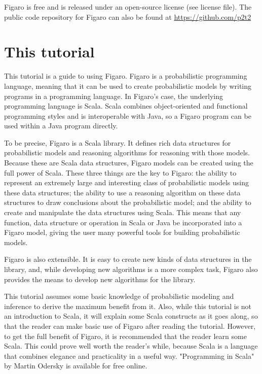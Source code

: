 Figaro is free and is released under an open-source license (see license file). The public code
repository for Figaro can also be found at \url{https://github.com/p2t2}



\section{This tutorial}

This tutorial is a guide to using Figaro. Figaro is a probabilistic programming language, meaning that it can be used to create probabilistic models by writing programs in a programming language. In Figaro's case, the underlying programming language is Scala. Scala combines object-oriented and functional programming styles and is interoperable with Java, so a Figaro program can be used within a Java program directly.

To be precise, Figaro is a Scala library. It defines rich data structures for probabilistic models and reasoning algorithms for reasoning with those models. Because these are Scala data structures, Figaro
models can be created using the full power of Scala. These three things are the key to Figaro: the ability to represent an extremely large and interesting class of probabilistic models using these data structures;
the ability to use a reasoning algorithm on these data structures to draw conclusions about the probabilistic model; and the ability to create and manipulate the data structures using Scala. This means that any function, data structure or operation in Scala or Java be incorporated into a Figaro model, giving
the user many powerful tools for building probabilistic models.

Figaro is also extensible. It is easy to create new kinds of data structures in the library, and, while developing new algorithms is a more complex task, Figaro also provides the means to develop new
algorithms for the library.

This tutorial assumes some basic knowledge of probabilistic modeling and inference to derive the maximum benefit from it. Also, while this tutorial is not an introduction to Scala, it will explain some Scala constructs as it goes along, so that the reader can make basic use of Figaro after reading the tutorial. However, to get the full benefit of Figaro, it is recommended that the reader learn some Scala. This could prove well worth the reader's while, because Scala is a language that combines elegance and practicality in a useful way. "Programming in Scala" by Martin Odersky is available for free online.

